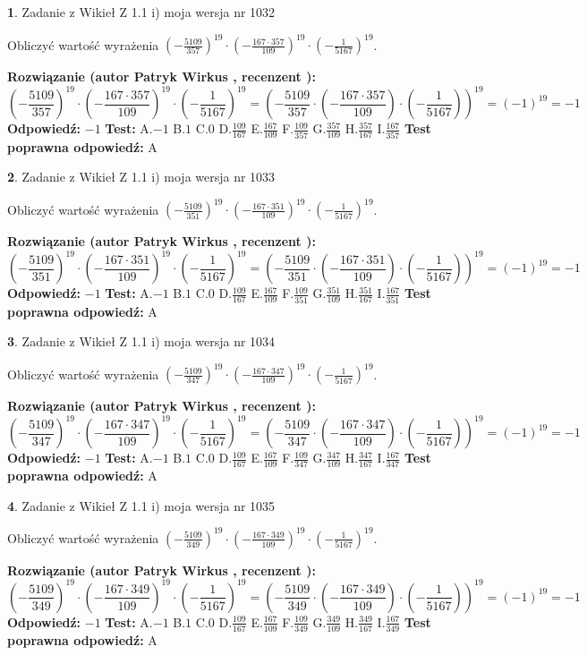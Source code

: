\documentclass[12pt, a4paper]{article}
\theoremstyle{definition} %
\newtheorem{zad}{}
\newcommand{\zadStart}[1]{\begin{zad}#1\newline}
\newcommand{\zadStop}{\end{zad}}
\newcommand{\rozwStart}[2]{\noindent \textbf{Rozwiązanie (autor #1 , recenzent #2): }\newline}
\newcommand{\rozwStop}{\newline}
\newcommand{\odpStart}{\noindent \textbf{Odpowiedź:}\newline}
\newcommand{\odpStop}{\newline}
\newcommand{\testStart}{\noindent \textbf{Test:}\newline}
\newcommand{\testStop}{\newline}
\newcommand{\kluczStart}{\noindent \textbf{Test poprawna odpowiedź:}\newline}
\newcommand{\kluczStop}{\newline}
\begin{document}
\zadStart{Zadanie z Wikieł Z 1.1 i) moja wersja nr 1032}

Obliczyć wartość wyrażenia $(-\frac{5109}{357})^{19} \cdot (-\frac{167 \cdot 357}{109})^{19} \cdot (-\frac{1}{5167})^{19}$.
\zadStop
\rozwStart{Patryk Wirkus}{}
$$(-\frac{5109}{357})^{19} \cdot (-\frac{167 \cdot 357}{109})^{19} \cdot (-\frac{1}{5167})^{19} = (-\frac{5109}{357} \cdot (-\frac{167 \cdot 357}{109}) \cdot (-\frac{1}{5167}))^{19} = (-1)^{19} = -1$$
\rozwStop
\odpStart
$-1$
\odpStop
\testStart
A.$-1$ B.$1$ C.$0$ D.$\frac{109}{167}$ E.$\frac{167}{109}$
F.$\frac{109}{357}$ G.$\frac{357}{109}$
H.$\frac{357}{167}$
I.$\frac{167}{357}$
\testStop
\kluczStart
A
\kluczStop



\zadStart{Zadanie z Wikieł Z 1.1 i) moja wersja nr 1033}

Obliczyć wartość wyrażenia $(-\frac{5109}{351})^{19} \cdot (-\frac{167 \cdot 351}{109})^{19} \cdot (-\frac{1}{5167})^{19}$.
\zadStop
\rozwStart{Patryk Wirkus}{}
$$(-\frac{5109}{351})^{19} \cdot (-\frac{167 \cdot 351}{109})^{19} \cdot (-\frac{1}{5167})^{19} = (-\frac{5109}{351} \cdot (-\frac{167 \cdot 351}{109}) \cdot (-\frac{1}{5167}))^{19} = (-1)^{19} = -1$$
\rozwStop
\odpStart
$-1$
\odpStop
\testStart
A.$-1$ B.$1$ C.$0$ D.$\frac{109}{167}$ E.$\frac{167}{109}$
F.$\frac{109}{351}$ G.$\frac{351}{109}$
H.$\frac{351}{167}$
I.$\frac{167}{351}$
\testStop
\kluczStart
A
\kluczStop



\zadStart{Zadanie z Wikieł Z 1.1 i) moja wersja nr 1034}

Obliczyć wartość wyrażenia $(-\frac{5109}{347})^{19} \cdot (-\frac{167 \cdot 347}{109})^{19} \cdot (-\frac{1}{5167})^{19}$.
\zadStop
\rozwStart{Patryk Wirkus}{}
$$(-\frac{5109}{347})^{19} \cdot (-\frac{167 \cdot 347}{109})^{19} \cdot (-\frac{1}{5167})^{19} = (-\frac{5109}{347} \cdot (-\frac{167 \cdot 347}{109}) \cdot (-\frac{1}{5167}))^{19} = (-1)^{19} = -1$$
\rozwStop
\odpStart
$-1$
\odpStop
\testStart
A.$-1$ B.$1$ C.$0$ D.$\frac{109}{167}$ E.$\frac{167}{109}$
F.$\frac{109}{347}$ G.$\frac{347}{109}$
H.$\frac{347}{167}$
I.$\frac{167}{347}$
\testStop
\kluczStart
A
\kluczStop



\zadStart{Zadanie z Wikieł Z 1.1 i) moja wersja nr 1035}

Obliczyć wartość wyrażenia $(-\frac{5109}{349})^{19} \cdot (-\frac{167 \cdot 349}{109})^{19} \cdot (-\frac{1}{5167})^{19}$.
\zadStop
\rozwStart{Patryk Wirkus}{}
$$(-\frac{5109}{349})^{19} \cdot (-\frac{167 \cdot 349}{109})^{19} \cdot (-\frac{1}{5167})^{19} = (-\frac{5109}{349} \cdot (-\frac{167 \cdot 349}{109}) \cdot (-\frac{1}{5167}))^{19} = (-1)^{19} = -1$$
\rozwStop
\odpStart
$-1$
\odpStop
\testStart
A.$-1$ B.$1$ C.$0$ D.$\frac{109}{167}$ E.$\frac{167}{109}$
F.$\frac{109}{349}$ G.$\frac{349}{109}$
H.$\frac{349}{167}$
I.$\frac{167}{349}$
\testStop
\kluczStart
A
\kluczStop
\end{document}

